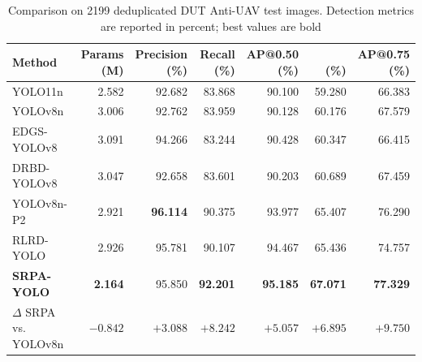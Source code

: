 \begin{table}[!t]
\caption{Comparison on 2199 deduplicated DUT Anti-UAV test images. Detection metrics are reported in percent; best values are bold\label{tab:main}}
\centering\srpatablesetup
\begin{tabular}{lrrrrrr}
\toprule
Method & \shortstack{Params\\(M)} & \shortstack{Precision\\(\%)} & \shortstack{Recall\\(\%)} & \shortstack{AP@0.50\\(\%)} & \shortstack{\mapall{}\\(\%)} & \shortstack{AP@0.75\\(\%)}\\
\midrule
YOLO11n & 2.582 & 92.682 & 83.868 & 90.100 & 59.280 & 66.383\\
YOLOv8n & 3.006 & 92.762 & 83.959 & 90.128 & 60.176 & 67.579\\
EDGS-YOLOv8 & 3.091 & 94.266 & 83.244 & 90.428 & 60.347 & 66.415\\
DRBD-YOLOv8 & 3.047 & 92.658 & 83.601 & 90.203 & 60.689 & 67.459\\
YOLOv8n-P2 & 2.921 & \textbf{96.114} & 90.375 & 93.977 & 65.407 & 76.290\\
RLRD-YOLO & 2.926 & 95.781 & 90.107 & 94.467 & 65.436 & 74.757\\
\textbf{SRPA-YOLO} & \textbf{2.164} & 95.850 & \textbf{92.201} & \textbf{95.185} & \textbf{67.071} & \textbf{77.329}\\
\addlinespace
$\Delta$ SRPA vs. YOLOv8n & $-0.842$ & $+3.088$ & $+8.242$ & $+5.057$ & $+6.895$ & $+9.750$\\
\bottomrule
\end{tabular}
\end{table}
